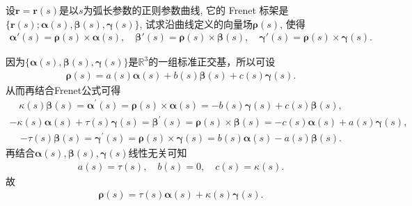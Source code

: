 \documentclass[../../main.tex]{subfiles}%
\begin{document}
\begin{example}
设$\bm{r} = \bm{r}(s)$是以$s$为弧长参数的正则参数曲线, 它的 Frenet 标架是$\{\bm{r}(s); \bm{\alpha}(s), \bm{\beta}(s), \bm{\gamma}(s)\}$, 试求沿曲线定义的向量场$\bm{\rho}(s)$, 使得
\begin{align*}
\bm{\alpha}'(s) = \bm{\rho}(s) \times \bm{\alpha}(s),\quad \bm{\beta}'(s) = \bm{\rho}(s) \times \bm{\beta}(s),\quad \bm{\gamma}'(s) = \bm{\rho}(s) \times \bm{\gamma}(s).
\end{align*}
\end{example}
\begin{solution}

因为$\{\bm{\alpha}\left(s\right),\bm{\beta}\left(s\right),\bm{\gamma}\left(s\right)\}$是$\mathbb{R}^3$的一组标准正交基，所以可设
\begin{align*}
\bm{\rho}\left(s\right)=a\left(s\right)\bm{\alpha}\left(s\right)+b\left(s\right)\bm{\beta}\left(s\right)+c\left(s\right)\bm{\gamma}\left(s\right).
\end{align*}
从而再结合Frenet公式可得
\begin{align*}
\kappa\left(s\right)\bm{\beta}\left(s\right)=\bm{\alpha}^\prime\left(s\right)=\bm{\rho}\left(s\right)\times\bm{\alpha}\left(s\right)=-b\left(s\right)\bm{\gamma}\left(s\right)+c\left(s\right)\bm{\beta}\left(s\right),
\end{align*}
\begin{align*}
-\kappa\left(s\right)\bm{\alpha}\left(s\right)+\tau\left(s\right)\bm{\gamma}\left(s\right)=\bm{\beta}^\prime\left(s\right)=\bm{\rho}\left(s\right)\times\bm{\beta}\left(s\right)=-c\left(s\right)\bm{\alpha}\left(s\right)+a\left(s\right)\bm{\gamma}\left(s\right),
\end{align*}
\begin{align*}
-\tau\left(s\right)\bm{\beta}\left(s\right)=\bm{\gamma}^\prime\left(s\right)=\bm{\rho}\left(s\right)\times\bm{\gamma}\left(s\right)=b\left(s\right)\bm{\alpha}\left(s\right)-a\left(s\right)\bm{\beta}\left(s\right).
\end{align*}
再结合$\bm{\alpha}\left(s\right),\bm{\beta}\left(s\right),\bm{\gamma}\left(s\right)$线性无关可知
\begin{align*}
a\left(s\right)=\tau\left(s\right),\quad b\left(s\right)=0,\quad c\left(s\right)=\kappa\left(s\right).
\end{align*}
故
\begin{align*}
\bm{\rho}\left(s\right)=\tau\left(s\right)\bm{\alpha}\left(s\right)+\kappa\left(s\right)\bm{\gamma}\left(s\right).
\end{align*}

\end{solution}
\end{document}
